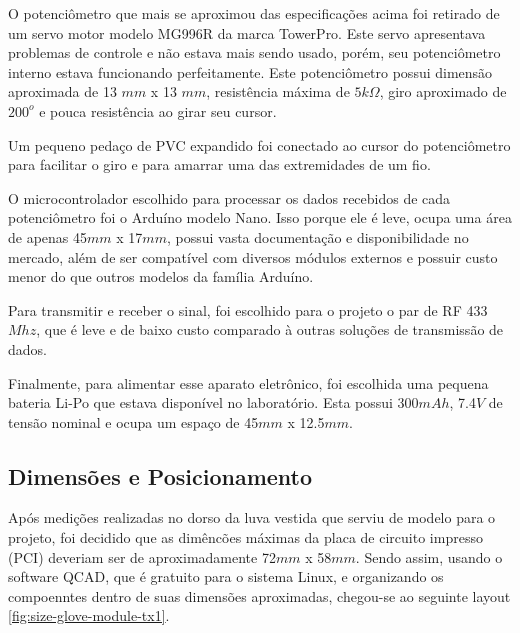 \documentclass{ufpatcc}
\begin{document}
			O potenciômetro que mais se aproximou das especificações acima foi retirado de um servo motor modelo MG996R da marca TowerPro. Este servo apresentava problemas de controle e não estava mais sendo usado, porém, seu potenciômetro interno estava funcionando perfeitamente. Este potenciômetro possui dimensão aproximada de 13 $mm$ x 13 $mm$, resistência máxima de $5 k\Omega$, giro aproximado de $200^{o}$ e pouca resistência ao girar seu cursor. 

			Um pequeno pedaço de PVC expandido foi conectado ao cursor do potenciômetro para facilitar o giro e para amarrar uma das extremidades de um fio.

			O microcontrolador escolhido para processar os dados recebidos de cada potenciômetro foi o Arduíno modelo Nano. Isso porque ele é leve, ocupa uma área de apenas 45$mm$ x 17$mm$, possui vasta documentação e disponibilidade no mercado, além de ser compatível com diversos módulos externos e possuir custo menor do que outros modelos da família Arduíno.

			Para transmitir e receber o sinal, foi escolhido para o projeto o par de RF 433$Mhz$, que é leve e de baixo custo comparado à outras soluções de transmissão de dados.

			Finalmente, para alimentar esse aparato eletrônico, foi escolhida uma pequena bateria Li-Po que estava disponível no laboratório. Esta possui 300$mAh$, 7.4$V$ de tensão nominal e ocupa um espaço de 45$mm$ x 12.5$mm$.

			\subsection{Dimensões e Posicionamento}

			Após medições realizadas no dorso da luva vestida que serviu de modelo para o projeto, foi decidido que as dimêncões máximas da placa de circuito impresso (PCI) deveriam ser de aproximadamente 72$mm$ x 58$mm$. Sendo assim, usando o software QCAD, que é gratuito para o sistema Linux, e organizando os compoenntes dentro de suas dimensões aproximadas, chegou-se ao seguinte layout \ref{fig:size-glove-module-tx1}.
\end{document}
